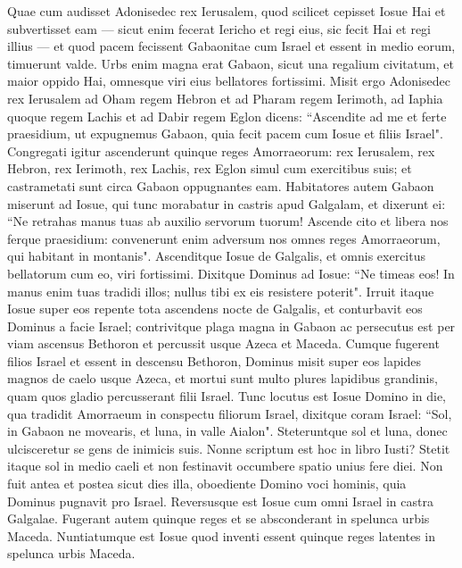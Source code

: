 \begin{biblechapter}  
\verse Quae cum audisset Adonisedec rex Ierusalem, quod scilicet cepisset Iosue Hai et subvertisset eam — sicut enim fecerat Iericho et regi eius, sic fecit Hai et regi illius — et quod pacem fecissent Gabaonitae cum Israel et essent in medio eorum, 
\verse timuerunt valde. Urbs enim magna erat Gabaon, sicut una regalium civitatum, et maior oppido Hai, omnesque viri eius bellatores fortissimi. 
\verse Misit ergo Adonisedec rex Ierusalem ad Oham regem Hebron et ad Pharam regem Ierimoth, ad Iaphia quoque regem Lachis et ad Dabir regem Eglon dicens: 
\verse “Ascendite ad me et ferte praesidium, ut expugnemus Gabaon, quia fecit pacem cum Iosue et filiis Israel". 
\verse Congregati igitur ascenderunt quinque reges Amorraeorum: rex Ierusalem, rex Hebron, rex Ierimoth, rex Lachis, rex Eglon simul cum exercitibus suis; et castrametati sunt circa Gabaon oppugnantes eam. 
\verse Habitatores autem Gabaon miserunt ad Iosue, qui tunc morabatur in castris apud Galgalam, et dixerunt ei: “Ne retrahas manus tuas ab auxilio servorum tuorum! Ascende cito et libera nos ferque praesidium: convenerunt enim adversum nos omnes reges Amorraeorum, qui habitant in montanis". 
\verse Ascenditque Iosue de Galgalis, et omnis exercitus bellatorum cum eo, viri fortissimi. 
\verse Dixitque Dominus ad Iosue: “Ne timeas eos! In manus enim tuas tradidi illos; nullus tibi ex eis resistere poterit". 
\verse Irruit itaque Iosue super eos repente tota ascendens nocte de Galgalis, 
\verse et conturbavit eos Dominus a facie Israel; contrivitque plaga magna in Gabaon ac persecutus est per viam ascensus Bethoron et percussit usque Azeca et Maceda. 
\verse Cumque fugerent filios Israel et essent in descensu Bethoron, Dominus misit super eos lapides magnos de caelo usque Azeca, et mortui sunt multo plures lapidibus grandinis, quam quos gladio percusserant filii Israel. 
\verse Tunc locutus est Iosue Domino in die, qua tradidit Amorraeum in conspectu filiorum Israel, dixitque coram Israel: “Sol, in Gabaon ne movearis, et luna, in valle Aialon". 
\verse Steteruntque sol et luna, donec ulcisceretur se gens de inimicis suis. Nonne scriptum est hoc in libro Iusti? Stetit itaque sol in medio caeli et non festinavit occumbere spatio unius fere diei. 
\verse Non fuit antea et postea sicut dies illa, oboediente Domino voci hominis, quia Dominus pugnavit pro Israel. 
\verse Reversusque est Iosue cum omni Israel in castra Galgalae. 
\verse Fugerant autem quinque reges et se absconderant in spelunca urbis Maceda.  
\verse Nuntiatumque est Iosue quod inventi essent quinque reges latentes in spelunca urbis Maceda. 

\end{biblechapter}
